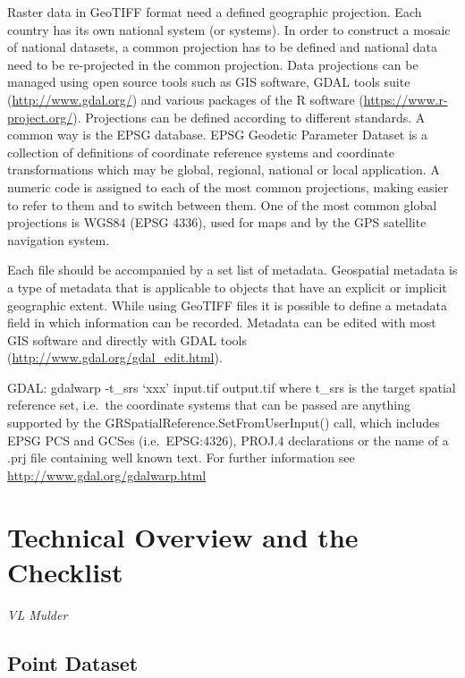 \documentclass[10pt,b5paper,]{book}
\theoremstyle{definition}
\theoremstyle{definition}
\theoremstyle{definition}
\theoremstyle{remark}
\begin{document}
Raster data in GeoTIFF format need a defined geographic projection. Each
country has its own national system (or systems). In order to construct
a mosaic of national datasets, a common projection has to be defined and
national data need to be re-projected in the common projection. Data
projections can be managed using open source tools such as GIS software,
GDAL tools suite (\url{http://www.gdal.org/}) and various packages of
the R software (\url{https://www.r-project.org/}). Projections can be
defined according to different standards. A common way is the EPSG
database. EPSG Geodetic Parameter Dataset is a collection of definitions
of coordinate reference systems and coordinate transformations which may
be global, regional, national or local application. A numeric code is
assigned to each of the most common projections, making easier to refer
to them and to switch between them. One of the most common global
projections is WGS84 (EPSG 4336), used for maps and by the GPS satellite
navigation system.

Each file should be accompanied by a set list of metadata. Geospatial
metadata is a type of metadata that is applicable to objects that have
an explicit or implicit geographic extent. While using GeoTIFF files it
is possible to define a metadata field in which information can be
recorded. Metadata can be edited with most GIS software and directly
with GDAL tools (\url{http://www.gdal.org/gdal_edit.html}).

GDAL: gdalwarp -t\_srs `xxx' input.tif output.tif where t\_srs is the
target spatial reference set, i.e.~the coordinate systems that can be
passed are anything supported by the
GRSpatialReference.SetFromUserInput() call, which includes EPSG PCS and
GCSes (i.e.~EPSG:4326), PROJ.4 declarations or the name of a .prj file
containing well known text. For further information see
\url{http://www.gdal.org/gdalwarp.html}

\hypertarget{technical-overview-and-the-checklist}{%
\chapter{Technical Overview and the
Checklist}\label{technical-overview-and-the-checklist}}

\emph{VL Mulder}

\hypertarget{point-dataset}{%
\section{Point Dataset}\label{point-dataset}}
\end{document}
